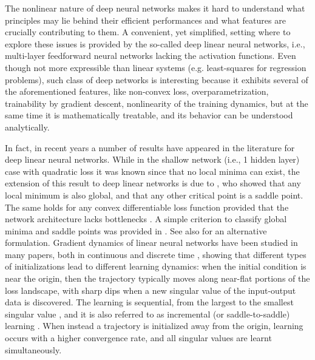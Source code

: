 \documentclass{article}
\newcommand{\1}{\mathds{1}}
\begin{document}
The nonlinear nature of deep neural networks makes it hard to understand what principles may lie behind their efficient performances and what features are crucially contributing to them.
A convenient, yet simplified, setting where to explore these issues is provided by the so-called deep linear neural networks, i.e., multi-layer feedforward neural networks lacking the activation functions.
Even though not more expressible than linear systems (e.g. least-squares for regression problems), such class of deep networks is interesting because it exhibits several of the aforementioned features, like non-convex loss, overparametrization, trainability by gradient descent, nonlinearity of the training dynamics, but at the same time it is mathematically treatable, and its behavior can be understood analytically. 

In fact, in recent years a number of results have appeared in the literature for deep linear neural networks. 
While in the shallow network (i.e., 1 hidden layer) case with quadratic loss it was known since \cite{baldi1989neural} that no local minima can exist, the extension of this result to deep linear networks is due to \cite{kawaguchi2016deep}, who showed that any local minimum is also global, and that any other critical point is a saddle point. The same holds for any convex differentiable loss function provided that the network architecture lacks bottlenecks \cite{laurent2018deep,trager2019pure}.
A simple criterion to classify global minima and saddle points was provided in \cite{yun2017global}. See also \cite{zhou2017critical} for an alternative formulation.
Gradient dynamics of linear neural networks have been studied in many papers, both in continuous \cite{saxe2013exact,arora2019implicit,tarmoun2021understanding,chitour2018geometric,cohen2024lecture} and discrete time \cite{arora2018convergence,arora2018optimization,gidel2019implicit}, showing that different types of initializations lead to different learning dynamics: when the initial condition is near the origin, then the trajectory typically moves along near-flat portions of the loss landscape, with sharp dips when a new singular value of the input-output data is discovered. The learning is sequential, from the largest to the smallest singular value \cite{saxe2013exact,gidel2019implicit}, and it is also referred to as incremental (or saddle-to-saddle) learning \cite{gidel2019implicit,gissin2019implicit,jacot2021saddle}.
When instead a trajectory is initialized away from the origin, learning occurs with a higher convergence rate, and all singular values are learnt simultaneously. 
\end{document}
